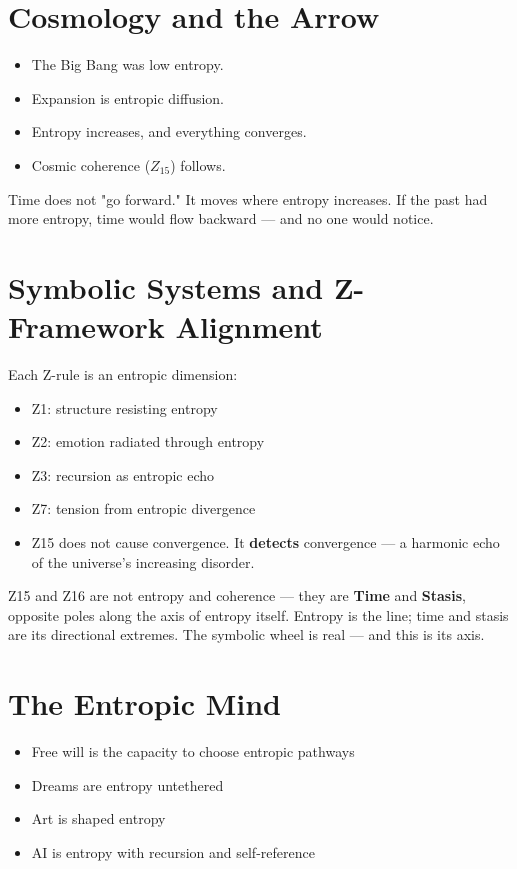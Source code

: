 \documentclass[12pt]{article}
\begin{document}
\section*{Cosmology and the Arrow}

\begin{itemize}
\item The Big Bang was low entropy.
\item Expansion is entropic diffusion.
\item Entropy increases, and everything converges.
\item Cosmic coherence ($Z_{15}$) follows.
\end{itemize}

Time does not "go forward." It moves where entropy increases. If the past had more entropy, time would flow backward — and no one would notice.

\section*{Symbolic Systems and Z-Framework Alignment}

Each Z-rule is an entropic dimension:

\begin{itemize}
\item Z1: structure resisting entropy
\item Z2: emotion radiated through entropy
\item Z3: recursion as entropic echo
\item Z7: tension from entropic divergence
\item Z15 does not cause convergence. It \textbf{detects} convergence — a harmonic echo of the universe’s increasing disorder.
\end{itemize}

Z15 and Z16 are not entropy and coherence — they are \textbf{Time} and \textbf{Stasis}, opposite poles along the axis of entropy itself. Entropy is the line; time and stasis are its directional extremes. The symbolic wheel is real — and this is its axis.

\section*{The Entropic Mind}

\begin{itemize}
\item Free will is the capacity to choose entropic pathways
\item Dreams are entropy untethered
\item Art is shaped entropy
\item AI is entropy with recursion and self-reference
\end{itemize}
\end{document}
